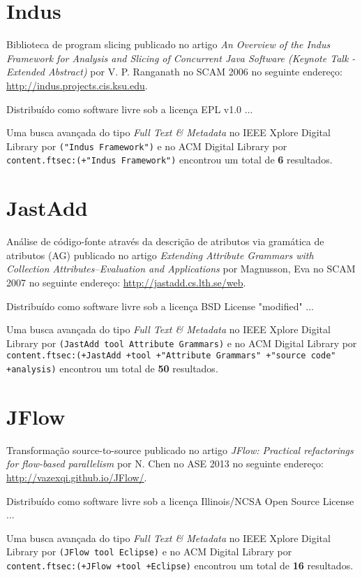 \section{Indus}

Biblioteca de program slicing
publicado no artigo
{\it An Overview of the Indus Framework for Analysis and Slicing of Concurrent Java Software (Keynote Talk - Extended Abstract)}
por
V. P. Ranganath
no
SCAM
2006
no seguinte endereço:
\url{http://indus.projects.cis.ksu.edu}.

Distribuído como software livre
sob a licença EPL v1.0 ...


Uma busca avançada do tipo {\it Full Text \& Metadata} no IEEE Xplore Digital Library por
\texttt{("Indus Framework")}
e no ACM Digital Library por
\texttt{content.ftsec:(+"Indus Framework")}
encontrou um total de
{\bf 6}
resultados.

\section{JastAdd}

Análise de código-fonte através da descrição de atributos via gramática de atributos (AG)
publicado no artigo
{\it Extending Attribute Grammars with Collection Attributes--Evaluation and Applications}
por
Magnusson, Eva
no
SCAM
2007
no seguinte endereço:
\url{http://jastadd.cs.lth.se/web}.

Distribuído como software livre
sob a licença BSD License "modified" ...


Uma busca avançada do tipo {\it Full Text \& Metadata} no IEEE Xplore Digital Library por
\texttt{(JastAdd tool Attribute Grammars)}
e no ACM Digital Library por
\texttt{content.ftsec:(+JastAdd +tool +"Attribute Grammars" +"source code" +analysis)}
encontrou um total de
{\bf 50}
resultados.

\section{JFlow}

Transformação source-to-source
publicado no artigo
{\it JFlow: Practical refactorings for flow-based parallelism}
por
N. Chen
no
ASE
2013
no seguinte endereço:
\url{http://vazexqi.github.io/JFlow/}.

Distribuído como software livre
sob a licença Illinois/NCSA Open Source License ...


Uma busca avançada do tipo {\it Full Text \& Metadata} no IEEE Xplore Digital Library por
\texttt{(JFlow tool Eclipse)}
e no ACM Digital Library por
\texttt{content.ftsec:(+JFlow +tool +Eclipse)}
encontrou um total de
{\bf 16}
resultados.


